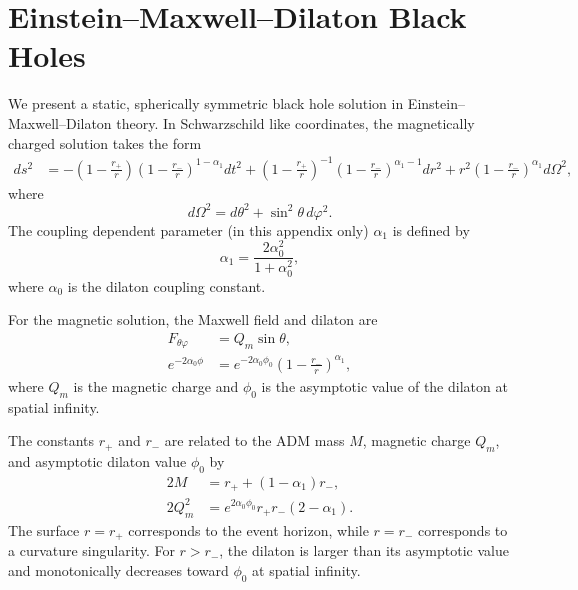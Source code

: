 \section{Einstein--Maxwell--Dilaton Black Holes}
\label{sec:appx:EMDBH}

We present a static, spherically symmetric black hole solution in Einstein--Maxwell--Dilaton theory. In Schwarzschild like coordinates, the magnetically charged solution takes the form
\begin{align}
ds^2 &=
-\left(1-\frac{r_+}{r}\right)
 \left(1-\frac{r_-}{r}\right)^{1-\alpha_1}
dt^2
+
\left(1-\frac{r_+}{r}\right)^{-1}
 \left(1-\frac{r_-}{r}\right)^{\alpha_1-1}
dr^2
+
r^2
\left(1-\frac{r_-}{r}\right)^{\alpha_1}
d\Omega^2 ,
\end{align}
where
\begin{equation}
d\Omega^2 = d\theta^2+\sin^2\theta\,d\varphi^2 .
\end{equation}
The coupling dependent parameter (in this appendix only) \(\alpha_1\) is 
defined by
\begin{equation}
\alpha_1 = \frac{2\alpha_0^2}{1+\alpha_0^2},
\end{equation}
where \(\alpha_0\) is the dilaton coupling constant.

For the magnetic solution, the Maxwell field and dilaton are
\begin{align}
F_{\theta\varphi} &= Q_m \sin\theta , \\
e^{-2\alpha_0\phi}
&=
e^{-2\alpha_0\phi_0}
\left(1-\frac{r_-}{r}\right)^{\alpha_1},
\end{align}
where \(Q_m\) is the magnetic charge and \(\phi_0\) is the asymptotic value of the dilaton at spatial infinity.

The constants \(r_+\) and \(r_-\) are related to the ADM mass \(M\), magnetic charge \(Q_m\), and asymptotic dilaton value \(\phi_0\) by
\begin{align}
2M &= r_+ + \left(1-\alpha_1\right)r_- , \\
2Q_m^2
&=
e^{2\alpha_0\phi_0}
r_+ r_-
\left(2-\alpha_1\right).
\end{align}
The surface \(r=r_+\) corresponds to the event horizon, while \(r=r_-\) corresponds to a curvature singularity. For \(r>r_-\), the dilaton is larger than its asymptotic value and monotonically decreases toward \(\phi_0\) at spatial infinity.

